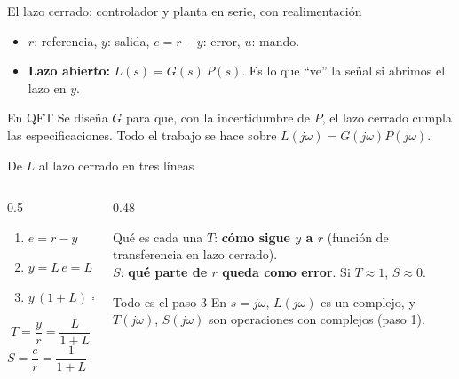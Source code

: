 \documentclass[aspectratio=169,11pt]{beamer}
\begin{document}
\begin{frame}{El lazo cerrado: controlador y planta en serie, con realimentación}
  \small
  \begin{center}
  \end{center}
  \begin{itemize}
    \item $r$: referencia, $y$: salida, $e=r-y$: error, $u$: mando.
    \item \textbf{Lazo abierto:} $L(s)=G(s)\,P(s)$. Es lo que ``ve'' la señal si abrimos el lazo en $y$.
  \end{itemize}
  \begin{block}{En QFT}
    Se diseña $G$ para que, con la incertidumbre de $P$, el lazo cerrado cumpla las especificaciones. Todo el trabajo se hace sobre $L(j\omega)=G(j\omega)P(j\omega)$.
  \end{block}
\end{frame}

\begin{frame}{De $L$ al lazo cerrado en tres líneas}
  \small
  \begin{columns}[T]
  \begin{column}{0.5\textwidth}
    \begin{enumerate}
      \item $e=r-y$
      \item $y=L\,e=L\,(r-y)$
      \item $y\,(1+L)=L\,r$
    \end{enumerate}
    \[ \boxed{T=\frac{y}{r}=\frac{L}{1+L}} \]
    \[ \boxed{S=\frac{e}{r}=\frac{1}{1+L}} \qquad S+T=1 \]
  \end{column}
  \begin{column}{0.48\textwidth}
    \begin{block}{Qué es cada una}
      $T$: \textbf{cómo sigue $y$ a $r$} (función de transferencia en lazo cerrado).\\[2pt]
      $S$: \textbf{qué parte de $r$ queda como error}. Si $T\approx1$, $S\approx0$.
    \end{block}
    \begin{alertblock}{Todo es el paso 3}
      En $s=j\omega$, $L(j\omega)$ es un complejo, y $T(j\omega)$, $S(j\omega)$ son operaciones con complejos (paso 1).
    \end{alertblock}
  \end{column}
  \end{columns}
\end{frame}
\end{document}
